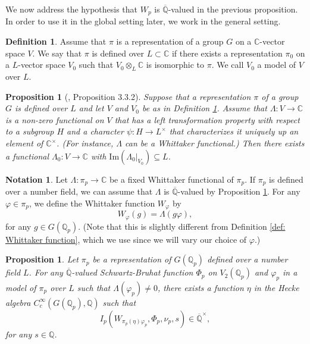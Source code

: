 \documentclass[11pt, a4paper]{amsart}
\theoremstyle{plain}
\newtheorem{proposition}[theorem]{Proposition}
\theoremstyle{definition}
\newtheorem{definition}[theorem]{Definition}
\newtheorem{notation}[theorem]{Notation}
\numberwithin{equation}{section}
\def\CC{\mathbb{C}}
\def\QQ{\mathbb{Q}}
\newcommand{\Qp}{\QQ_p}
\begin{document}
We now address the hypothesis that $W_{p}$ is $\overline{\QQ}$-valued in the previous proposition. In order to use it in the global setting later, we work in the general setting. 

\begin{definition}
\label{def: field of def of a rep}
    Assume that $\pi$ is a representation of a group $G$ on a $\CC$-vector space $V$. We say that $\pi$ is defined over $L \subset \CC$ if there exists a representation $\pi_{0}$ on a $L$-vector space $V_{0}$ such that $V_{0} \otimes_{L} \CC$ is isomorphic to $\pi$. We call $V_{0}$ a model of $V$ over $L$. 
\end{definition}

\begin{proposition}[\cite{HS18}, Proposition 3.3.2] 
\label{prop: rational whittaker}
    Suppose that a representation $\pi$ of a group $G$ is defined over $L$ and let $V$ and $V_{0}$ be as in Definition \ref{def: field of def of a rep}. Assume that $\Lambda\colon V \rightarrow \CC$ is a non-zero functional on $V$ that has a left transformation property with respect to a subgroup $H$ and a character $\psi \colon H \rightarrow L^{\times}$ that characterizes it uniquely up an element of $\CC^{\times}$. (For instance, $\Lambda$ can be a Whittaker functional.) Then there exists a functional $\Lambda_{0} \colon  V \rightarrow \CC$ with $\mathrm{Im}(\Lambda_{0}|_{V_{0}}) \subseteq L$. 
\end{proposition}

\begin{notation}
    Let $\Lambda: \pi_{p} \rightarrow \CC$ be a fixed Whittaker functional of $\pi_p$. If $\pi_{p}$ is defined over a number field, we can assume that $\Lambda$ is $\overline{\QQ}$-valued  by Proposition \ref{prop: rational whittaker}. For any $\varphi \in \pi_{p}$, we define the Whittaker function $W_{\varphi}$ by 
    \begin{equation*}
        W_{\varphi}(g) = \Lambda(g \varphi),
    \end{equation*}
    for any $g \in G(\QQ_{p})$. 
    (Note that this is slightly different from Definition \ref{def: Whittaker function}, which we use since we will vary our choice of $\varphi$.)
\end{notation}

\begin{proposition}
\label{Prop:algebracity}
Let $\pi_{p}$ be a representation of $G(\Qp)$ defined over a number field $L$. For any $\overline{\QQ}$-valued Schwartz-Bruhat function $\Phi_{p}$ on $V_{2}(\Qp)$ and $\varphi_{p}$ in a model of $\pi_p$ over $L$ such that $\Lambda(\varphi_{p}) \neq 0$,  there exists a function $\eta$ in the Hecke algebra $C_{c}^{\infty}(G(\Qp), \QQ)$ such that 
\begin{equation*}
     I_{p}(W_{\pi_{p}(\eta)\varphi_p}, \Phi_p, \nu_p, s) \in \overline{\QQ}^{\times},
\end{equation*}
for any $s \in \QQ$. 
\end{proposition}
\end{document}
